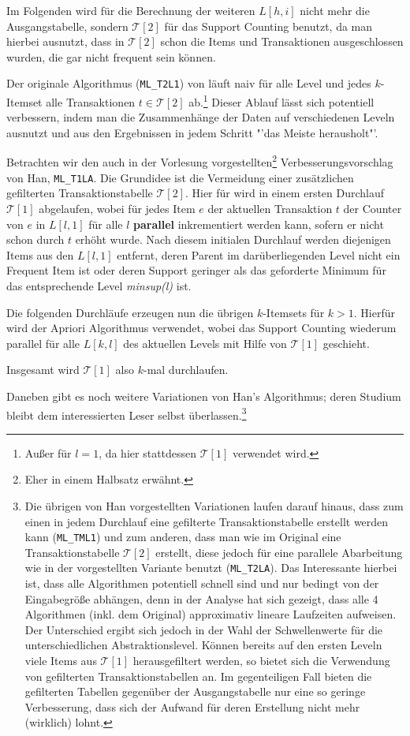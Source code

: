 Im Folgenden wird für die Berechnung der weiteren \(L[h,i]\) nicht mehr die
Ausgangstabelle, sondern \(\mathcal{T}[2]\) für das Support Counting benutzt, da
man hierbei ausnutzt, dass in \(\mathcal{T}[2]\) schon die Items und Transaktionen
ausgeschlossen wurden, die gar nicht frequent sein können.

Der originale Algorithmus (\texttt{ML\_T2L1}) von \citet{Han95} läuft naiv für
alle Level und jedes \(k\)-Itemset alle Transaktionen \(t \in \mathcal{T}[2]\)
ab.\footnote{Außer für \(l=1\), da hier stattdessen \(\mathcal{T}[1]\) verwendet wird.}
Dieser Ablauf lässt sich potentiell  verbessern, indem man die Zusammenhänge der
Daten auf verschiedenen Leveln ausnutzt und aus den Ergebnissen in jedem Schritt
"'das Meiste herausholt"'.

Betrachten wir den auch in der Vorlesung vorgestellten\footnote{Eher in einem Halbsatz
erwähnt.} Verbesserungsvorschlag von Han, 
\texttt{ML\_T1LA}. Die Grundidee ist die Vermeidung einer zusätzlichen gefilterten
Transaktionstabelle \(\mathcal{T}[2]\). Hier für wird in einem ersten Durchlauf
\(\mathcal{T}[1]\) abgelaufen, wobei für jedes Item \(e\) der aktuellen Transaktion
\(t\) der Counter von \(e\) in \(L[l,1]\) für alle \(l\) \textbf{parallel}
inkrementiert werden kann, sofern er nicht schon durch \(t\) erhöht wurde.
Nach diesem initialen Durchlauf werden diejenigen Items aus den \(L[l,1]\) entfernt,
deren Parent im darüberliegenden Level nicht ein Frequent Item ist oder deren
Support geringer als das geforderte Minimum für das entsprechende Level 
\textit{minsup(l)} ist.

Die folgenden Durchläufe erzeugen nun die übrigen \(k\)-Itemsets für {\(k>1\)}.
Hierfür wird der Apriori Algorithmus verwendet, wobei das Support Counting 
wiederum parallel für alle \(L[k,l]\) des aktuellen Levels mit Hilfe von
\(\mathcal{T}[1]\) geschieht.

Insgesamt wird \(\mathcal{T}[1]\) also \(k\)-mal durchlaufen.

Daneben gibt es noch weitere Variationen von Han's Algorithmus; deren Studium
bleibt dem interessierten Leser selbst überlassen.\footnote{Die übrigen von Han
vorgestellten Variationen laufen darauf hinaus, dass zum einen in jedem Durchlauf
eine gefilterte Transaktionstabelle erstellt werden kann (\texttt{ML\_TML1}) und
zum anderen, dass man wie im Original eine Transaktionstabelle
\(\mathcal{T}[2]\) erstellt, diese jedoch für eine parallele Abarbeitung wie in
der vorgestellten Variante benutzt (\texttt{ML\_T2LA}). Das Interessante hierbei ist,
dass alle Algorithmen potentiell schnell sind und nur bedingt von der Eingabegröße
abhängen, denn in der Analyse hat sich gezeigt, dass alle 4 Algorithmen (inkl. dem
Original) approximativ lineare Laufzeiten aufweisen. Der Unterschied ergibt sich
jedoch in der Wahl der Schwellenwerte für die unterschiedlichen Abstraktionslevel.
Können bereits auf den ersten Leveln viele Items aus \(\mathcal{T}[1]\) herausgefiltert
werden, so bietet sich die Verwendung von gefilterten Transaktionstabellen an.
Im gegenteiligen Fall bieten die gefilterten Tabellen gegenüber der Ausgangstabelle
nur eine so geringe Verbesserung, dass sich der Aufwand für deren Erstellung nicht
mehr (wirklich) lohnt.}


